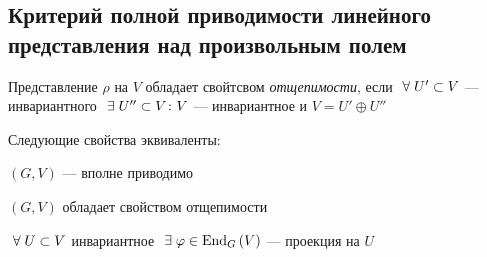 \subsection{Критерий полной приводимости линейного представления над произвольным полем}
\begin{df}
	Представление $\rho$ на $V$ обладает свойтсвом \textit{отщепимости},
	если $~\forall\; U' \subset V$ --- инвариантного $~\exists\; U'' \subset V \colon V$ --- инвариантное
	и $V = U' \oplus U''$
\end{df}
\begin{stm}
	Следующие свойства эквиваленты:
	\begin{points}{-3}
		\item $(G, V)$ --- вполне приводимо
		\item $(G, V)$ обладает свойством отщепимости
		\item $~\forall\; U \subset V$ инвариантное $~\exists\; \varphi \in \operatorname{End}_G\left(V\right)$ --- проекция на $U$ 
	\end{points}
\end{stm}
